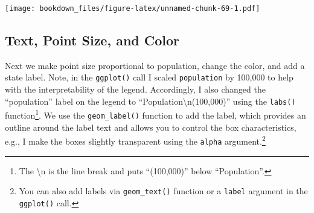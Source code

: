 \documentclass[
]{krantz}
\makeatletter
\newenvironment{Shaded}{\begin{snugshade}}{\end{snugshade}}
\newcommand{\DataTypeTok}[1]{\textcolor[rgb]{0.27,0.27,0.27}{#1}}
\newcommand{\DecValTok}[1]{\textcolor[rgb]{0.06,0.06,0.06}{#1}}
\newcommand{\KeywordTok}[1]{\textcolor[rgb]{0.27,0.27,0.27}{\textbf{#1}}}
\newcommand{\NormalTok}[1]{#1}
\newcommand{\OperatorTok}[1]{\textcolor[rgb]{0.43,0.43,0.43}{\textbf{#1}}}
\newcommand{\StringTok}[1]{\textcolor[rgb]{0.5,0.5,0.5}{#1}}
\newenvironment{kframe}{%
\medskip{}
\setlength{\fboxsep}{.8em}
 \def\at@end@of@kframe{}%
 \ifinner\ifhmode%
  \def\at@end@of@kframe{\end{minipage}}%
  \begin{minipage}{\columnwidth}%
 \fi\fi%
 \def\FrameCommand##1{\hskip\@totalleftmargin \hskip-\fboxsep
 \colorbox{shadecolor}{##1}\hskip-\fboxsep
     \hskip-\linewidth \hskip-\@totalleftmargin \hskip\columnwidth}%
 \MakeFramed {\advance\hsize-\width
   \@totalleftmargin\z@ \linewidth\hsize
   \@setminipage}}%
 {\par\unskip\endMakeFramed%
 \at@end@of@kframe}
\renewenvironment{Shaded}{\begin{kframe}}{\end{kframe}}
\makeatother
\begin{document}
\begin{Shaded}
\end{Shaded}

\texttt{[image: bookdown\_files/figure-latex/unnamed-chunk-69-1.pdf]}

\hypertarget{text-point-size-and-color}{%
\subsection{Text, Point Size, and Color}\label{text-point-size-and-color}}

Next we make point size proportional to population, change the color, and add a state label. Note, in the \texttt{ggplot()} call I scaled \texttt{population} by 100,000 to help with the interpretability of the legend. Accordingly, I also changed the ``population'' label on the legend to ``Population\textbackslash n(100,000)'' using the \texttt{labs()} function\footnote{The \textbackslash n is the line break and puts ``(100,000)'' below ``Population''.}. We use the \texttt{geom\_label()} function to add the label, which provides an outline around the label text and allows you to control the box characteristics, e.g., I make the boxes slightly transparent using the \texttt{alpha} argument.\footnote{You can also add labels via \texttt{geom\_text()} function or a \texttt{label} argument in the \texttt{ggplot()} call.}
\end{document}
